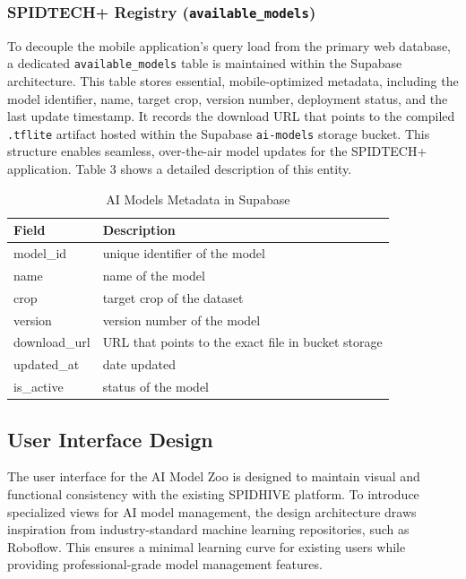 \documentclass{icsthesis}
\begin{document}
\begin{mainmatter}
            \subsubsection{SPIDTECH+ Registry (\texttt{available\_models})}
            To decouple the mobile application's query load from the primary web database, a dedicated \texttt{available\_models} table is maintained within the Supabase architecture. This table stores essential, mobile-optimized metadata, including the model identifier, name, target crop, version number, deployment status, and the last update timestamp. It records the download URL that points to the compiled \texttt{.tflite} artifact hosted within the Supabase \texttt{ai-models} storage bucket. This structure enables seamless, over-the-air model updates for the SPIDTECH+ application. Table 3 shows a detailed description of this entity.
            
            \begin{table}[htbp]
                \centering
                \caption{AI Models Metadata in Supabase}
                \label{tab:supabase_metadata}
                \begin{tabular}{p{} p{}}
                    \toprule
                    \textbf{Field}      & \textbf{Description} \\ 
                    \midrule
                    model\_id           & unique identifier of the model \\ 
                    name                & name of the model\\
                    crop                & target crop of the dataset \\ 
                    version             & version number of the model\\ 
                    download\_url       & URL that points to the exact file in bucket storage \\  
                    updated\_at         & date updated \\
                    is\_active          & status of the model\\
                    \bottomrule
                \end{tabular}
            \end{table}
            
            \subsection{User Interface Design}
            The user interface for the AI Model Zoo is designed to maintain visual and functional consistency with the existing SPIDHIVE platform. To introduce specialized views for AI model management, the design architecture draws inspiration from industry-standard machine learning repositories, such as Roboflow. This ensures a minimal learning curve for existing users while providing professional-grade model management features.
            

\end{mainmatter}
\end{document}
